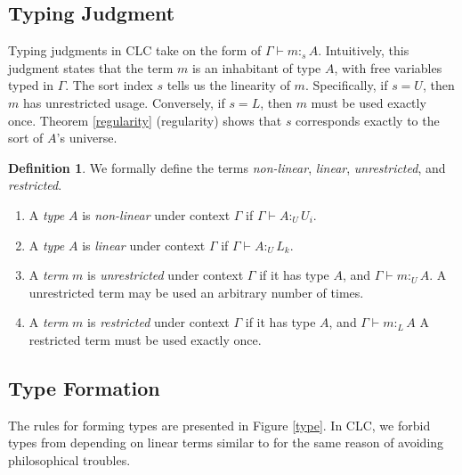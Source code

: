 \documentclass{article}
\theoremstyle{definition}
\newtheorem{definition}{Definition}[section]
\newcommand{\utype}{:_{\scriptscriptstyle U}}
\newcommand{\ltype}{:_{\scriptscriptstyle L}}
\newcommand{\stype}[1]{:_#1}
\begin{document}
  \subsection{Typing Judgment}
  Typing judgments in CLC take on the form of $\Gamma \vdash m \stype{s} A$. Intuitively, this judgment states that the term $m$ is an inhabitant of type $A$, with free variables typed in $\Gamma$. The sort index $s$ tells us the linearity of $m$. Specifically, if $s = U$, then $m$ has unrestricted usage. Conversely, if $s = L$, then $m$ must be used exactly once. Theorem \ref{regularity} (regularity) shows that $s$ corresponds exactly to the sort of $A$'s universe.

  \begin{definition} We formally define the terms \textit{non-linear}, \textit{linear}, \textit{unrestricted}, and \textit{restricted}.
    \begin{enumerate}
      \item A \textit{type} $A$ is \textit{non-linear} under context $\Gamma$ if $\Gamma \vdash A \utype U_i$.
      \item A \textit{type} $A$ is \textit{linear} under context $\Gamma$ if $\Gamma \vdash A \utype L_k$.
      \item A \textit{term} $m$ is \textit{unrestricted} under context $\Gamma$ if it has type $A$, and $\Gamma \vdash m \utype A$. A unrestricted term may be used an arbitrary number of times.
      \item A \textit{term} $m$ is \textit{restricted} under context $\Gamma$ if it has type $A$, and $\Gamma \vdash m \ltype A$ A restricted term must be used exactly once.
    \end{enumerate}
  \end{definition}

  \subsection{Type Formation} \label{tyformation}
  The rules for forming types are presented in Figure \ref{type}. In CLC, we forbid types from depending on linear terms similar to \cite{llf,neel15} for the same reason of avoiding philosophical troubles.
\end{document}
